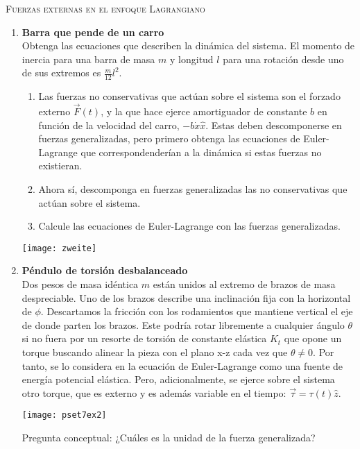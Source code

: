 \documentclass[11pt, spanish, a4paper, twoside]{article}
\begin{document}
\begin{center}
  \textsc{\large Fuerzas externas en el enfoque Lagrangiano}
\end{center}

\begin{enumerate}

\item 
\begin{minipage}[t][8cm]{0.55\textwidth} 
\textbf{Barra que pende de un carro}\\
Obtenga las ecuaciones que describen la dinámica del sistema.
El momento de inercia para una barra de masa \(m\) y longitud \(l\) para una rotación desde uno de sus extremos es \(\frac{m}{12} l^2\). 
\begin{enumerate}
	\item Las fuerzas no conservativas que actúan sobre el sistema son el forzado externo \(\vec{F}(t)\), y la que hace ejerce amortiguador de constante \(b\) en función de la velocidad del carro,  \(- b \dot{x} \hat{x}\).
	Estas deben descomponerse en fuerzas generalizadas, pero primero obtenga las ecuaciones de Euler-Lagrange que correspondenderían a la dinámica si estas fuerzas no existieran.
	\item Ahora sí, descomponga en fuerzas generalizadas las no conservativas que actúan sobre el sistema.
	\item Calcule las ecuaciones de Euler-Lagrange con las fuerzas generalizadas.
\end{enumerate}
\end{minipage}
\begin{minipage}[c][-1cm][t]{0.4\textwidth}
	\texttt{[image: zweite]}
\end{minipage}



\item 
\begin{minipage}[t][5.3cm]{0.6\textwidth}
\textbf{Péndulo de torsión desbalanceado}\\
Dos pesos de masa idéntica $m$ están unidos al extremo de brazos de masa despreciable.
Uno de los brazos describe una inclinación fija con la horizontal de $\phi$.
Descartamos la fricción con los rodamientos que mantiene vertical el eje de donde parten los brazos.
Este podría rotar libremente a cualquier ángulo $\theta$ si no fuera por un resorte de torsión de constante elástica $K_t$ que opone un torque buscando alinear la pieza con el plano x-z cada vez que $\theta \neq 0$.
Por tanto, se lo considera en la ecuación de Euler-Lagrange como una fuente de energía potencial elástica.
Pero, adicionalmente, se ejerce sobre el sistema otro torque, que es externo y es además variable en el tiempo: $\vec{\tau}= \tau (t) \hat{z}$.
\end{minipage}
\begin{minipage}[c][0cm][t]{0.35\textwidth}
	\texttt{[image: pset7ex2]}
\end{minipage}
Pregunta conceptual:
¿Cuáles es la unidad de la fuerza generalizada?


\end{enumerate}
\end{document}
